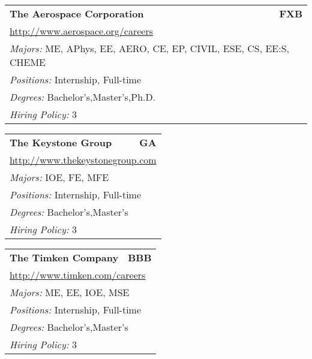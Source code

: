 \documentclass[twoside]{article}
\begin{document}
\begin{center}
\begin{multicols}{3}
\begin{FlushLeft}
\begin{minipage}{\columnwidth}
\end{minipage}
 
\begin{minipage}{\columnwidth}\begin{tabularx}{.95\columnwidth}{Xr}
                 {\Large\bf The Aerospace Corporation} & {\Large\bf FXB}\\
    \multicolumn{2}{p{.95\columnwidth}}{\url{http://www.aerospace.org/careers}}\\
    \multicolumn{2}{p{.95\columnwidth}}{\emph{Majors:} ME, APhys, EE, AERO, CE, EP, CIVIL, ESE, CS, EE:S, CHEME}\\
    \multicolumn{2}{p{.95\columnwidth}}{\emph{Positions:} Internship, Full-time}\\
    \multicolumn{2}{p{.95\columnwidth}}{\emph{Degrees:} Bachelor's,Master's,Ph.D.}\\
    \multicolumn{2}{p{.95\columnwidth}}{\emph{Hiring Policy:} 3}\\
    \end{tabularx}
    
\end{minipage}
 
\begin{minipage}{\columnwidth}\begin{tabularx}{.95\columnwidth}{Xr}
                 {\Large\bf The Keystone Group} & {\Large\bf GA}\\
    \multicolumn{2}{p{.95\columnwidth}}{\url{http://www.thekeystonegroup.com}}\\
    \multicolumn{2}{p{.95\columnwidth}}{\emph{Majors:} IOE, FE, MFE}\\
    \multicolumn{2}{p{.95\columnwidth}}{\emph{Positions:} Internship, Full-time}\\
    \multicolumn{2}{p{.95\columnwidth}}{\emph{Degrees:} Bachelor's,Master's}\\
    \multicolumn{2}{p{.95\columnwidth}}{\emph{Hiring Policy:} 3}\\
    \end{tabularx}
    
\end{minipage}
 
\begin{minipage}{\columnwidth}\begin{tabularx}{.95\columnwidth}{Xr}
                 {\Large\bf The Timken Company} & {\Large\bf BBB}\\
    \multicolumn{2}{p{.95\columnwidth}}{\url{http://www.timken.com/careers}}\\
    \multicolumn{2}{p{.95\columnwidth}}{\emph{Majors:} ME, EE, IOE, MSE}\\
    \multicolumn{2}{p{.95\columnwidth}}{\emph{Positions:} Internship, Full-time}\\
    \multicolumn{2}{p{.95\columnwidth}}{\emph{Degrees:} Bachelor's,Master's}\\
    \multicolumn{2}{p{.95\columnwidth}}{\emph{Hiring Policy:} 3}\\
    \end{tabularx}
    

\end{minipage}
\end{FlushLeft}
\end{multicols}
\end{center}
\end{document}
